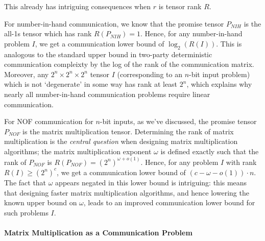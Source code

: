 \documentclass[10pt,a4paper]{article}
\begin{document}
     This already has intriguing consequences when $r$ is tensor rank $R$.
     
     For number-in-hand communication, we know that the promise tensor $P_{NIH}$ is the all-1s tensor which has rank $R(P_{NIH}) = 1$. Hence, for any number-in-hand problem $I$, we get a communication lower bound of $\log_2(R(I))$. This is analogous to the standard upper bound in two-party deterministic communication compleixty by the log of the rank of the communication matrix. Moreover, any $2^n \times 2^n \times 2^n$ tensor $I$ (corresponding to an $n$-bit input problem) which is not `degenerate' in some way has rank at least $2^n$, which explains why nearly all number-in-hand communication problems require linear communication. 

     For NOF communication for $n$-bit inputs, as we've discussed, the promise tensor $P_{NOF}$ is the matrix multiplication tensor. Determining the rank of matrix multiplication is the \emph{central question} when designing matrix multiplication algorithms; the matrix multiplication exponent $\omega$ is defined exactly such that the rank of $P_{NOF}$ is $R(P_{NOF}) = (2^n)^{\omega + o(1)}$. Hence, for any problem $I$ with rank $R(I) \geq (2^n)^c$, we get a communication lower bound of $(c - \omega - o(1)) \cdot n$. The fact that $\omega$ appears negated in this lower bound is intriguing: this means that designing faster matrix multiplication algorithms, and hence lowering the known upper bound on $\omega$, leads to an improved communication lower bound for such problems $I$. 

     \paragraph{Matrix Multiplication as a Communication Problem}
\end{document}
